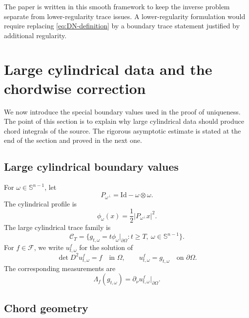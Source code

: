 \documentclass[11pt]{article}
\numberwithin{equation}{section}
\newcommand{\Sn}{\mathbb S^{n-1}}
\newcommand{\bd}{\partial}
\newcommand{\Om}{\Omega}
\newcommand{\DN}{\Lambda}
\newcommand{\Id}{\mathrm{Id}}
\begin{document}
The paper is written in this smooth framework to keep the inverse problem separate from lower-regularity trace issues.  A lower-regularity formulation would require replacing \eqref{eq:DN-definition} by a boundary trace statement justified by additional regularity.

\section{Large cylindrical data and the chordwise correction}\label{sec:large-cylindrical-data}

We now introduce the special boundary values used in the proof of uniqueness.  The point of this section is to explain why large cylindrical data should produce chord integrals of the source.  The rigorous asymptotic estimate is stated at the end of the section and proved in the next one.

\subsection{Large cylindrical boundary values}

For \(\omega\in\Sn\), let
\[
    P_{\omega^\perp}=\Id-\omega\otimes\omega.
\]
The cylindrical profile is
\begin{equation}\label{eq:phi-omega}
    \phi_\omega(x)=\frac12|P_{\omega^\perp}x|^2.
\end{equation}
The large cylindrical trace family is
\begin{equation}\label{eq:cylindrical-trace-family}
    \mathcal C_{T}
    =
    \{g_{t,\omega}=t\phi_\omega|_{\bd\Om}:t\ge T,\ \omega\in\Sn\}.
\end{equation}
For \(f\in\mathcal F\), we write \(u_{t,\omega}^f\) for the solution of
\begin{equation}\label{eq:large-data-equation-intro}
    \det D^2u_{t,\omega}^f=f
    \quad\text{in }\Om,
    \qquad
    u_{t,\omega}^f=g_{t,\omega}
    \quad\text{on }\bd\Om.
\end{equation}
The corresponding measurements are
\begin{equation}\label{eq:DN-large-family}
    \DN_f(g_{t,\omega})
    =
    \partial_\nu u_{t,\omega}^f|_{\bd\Om}.
\end{equation}


\subsection{Chord geometry}\label{subsec:chord-geometry}
\end{document}
